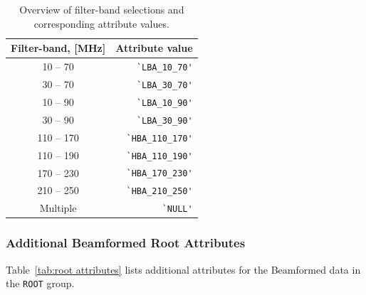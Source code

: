 \documentclass[a4paper,10pt,bibtotoc]{scrartcl}
\begin{document}
\begin{table}[ht]
  \centering
  \begin{tabular}{|cr|}
    \hline
    \sc Filter-band, [MHz] & \sc Attribute value \\
    \hline \hline
    10 -- 70   & \verb|`LBA_10_70'| \\
    30 -- 70   & \verb|`LBA_30_70'| \\
    10 -- 90   & \verb|`LBA_10_90'| \\
    30 -- 90   & \verb|`LBA_30_90'| \\
    110 -- 170 & \verb|`HBA_110_170'| \\
    110 -- 190 & \verb|`HBA_110_190'| \\
    170 -- 230 & \verb|`HBA_170_230'| \\
    210 -- 250 & \verb|`HBA_210_250'| \\
    Multiple  & \verb|`NULL'| \\
    \hline
  \end{tabular}
  \caption{Overview of filter-band selections and corresponding
    attribute values.}
  \label{tab:filter-selection}
\end{table}





\clearpage
\subsubsection{Additional Beamformed Root Attributes}
\label{sec:additional beamformed root attributes}

Table~\ref{tab:root attributes} lists additional attributes for the Beamformed data in the \verb|ROOT| group.
\end{document}
